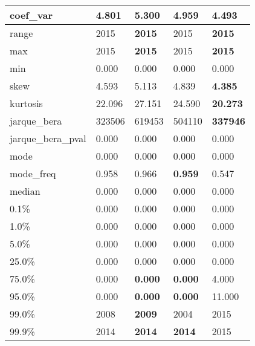 \begin{table}[H]
\begin{tabular}{|l|m{10em}|m{10em}|m{10em}|m{10em}|}
\hline coef\_var & 4.801 & \cellcolor[rgb]{0.9, 0.54, 0.52} 5.300 & \bfseries 4.959 & 4.493 \\
\hline range & 2015 & \bfseries 2015 & \cellcolor[rgb]{0.9, 0.54, 0.52} 2015 & \bfseries 2015 \\
\hline max & 2015 & \bfseries 2015 & \cellcolor[rgb]{0.9, 0.54, 0.52} 2015 & \bfseries 2015 \\
\hline min & 0.000 & 0.000 & 0.000 & 0.000 \\
\hline skew & 4.593 & \cellcolor[rgb]{0.9, 0.54, 0.52} 5.113 & 4.839 & \bfseries 4.385 \\
\hline kurtosis & 22.096 & \cellcolor[rgb]{0.9, 0.54, 0.52} 27.151 & 24.590 & \bfseries 20.273 \\
\hline jarque\_bera & 323506 & \cellcolor[rgb]{0.9, 0.54, 0.52} 619453 & 504110 & \bfseries 337946 \\
\hline jarque\_bera\_pval & 0.000 & 0.000 & 0.000 & 0.000 \\
\hline mode & 0.000 & 0.000 & 0.000 & 0.000 \\
\hline mode\_freq & 0.958 & 0.966 & \bfseries 0.959 & \cellcolor[rgb]{0.9, 0.54, 0.52} 0.547 \\
\hline median & 0.000 & 0.000 & 0.000 & 0.000 \\
\hline 0.1\% & 0.000 & 0.000 & 0.000 & 0.000 \\
\hline 1.0\% & 0.000 & 0.000 & 0.000 & 0.000 \\
\hline 5.0\% & 0.000 & 0.000 & 0.000 & 0.000 \\
\hline 25.0\% & 0.000 & 0.000 & 0.000 & 0.000 \\
\hline 75.0\% & 0.000 & \bfseries 0.000 & \bfseries 0.000 & \cellcolor[rgb]{0.9, 0.54, 0.52} 4.000 \\
\hline 95.0\% & 0.000 & \bfseries 0.000 & \bfseries 0.000 & \cellcolor[rgb]{0.9, 0.54, 0.52} 11.000 \\
\hline 99.0\% & 2008 & \bfseries 2009 & 2004 & \cellcolor[rgb]{0.9, 0.54, 0.52} 2015 \\
\hline 99.9\% & 2014 & \bfseries 2014 & \bfseries 2014 & \cellcolor[rgb]{0.9, 0.54, 0.52} 2015 \\
\hline
\end{tabular}
\end{table}
